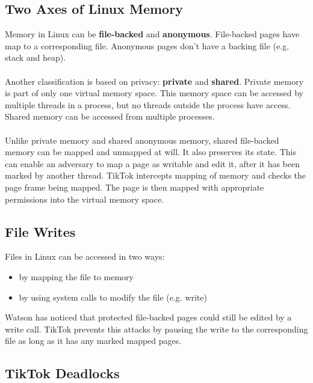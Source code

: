 \documentclass[conference]{IEEEtran}
\begin{document}
\subsection{Two Axes of Linux Memory}

Memory in Linux can be \textbf{file-backed} and \textbf{anonymous}. File-backed pages have map to a corresponding file. 
Anonymous pages don't have a backing file (e.g. stack and heap).
\\
\\
Another classification is based on privacy: \textbf{private} and \textbf{shared}. Private memory is part of only one virtual memory space.
This memory space can be accessed by multiple threads in a process, but no threads outside the process have access.
Shared memory can be accessed from multiple processes.
\\
\\
Unlike private memory and shared anonymous memory, shared file-backed memory can be mapped and unmapped at will. It 
also preserves its state. This can enable an adversary to map a page as writable and edit it, after it has been marked 
by another thread. TikTok intercepts mapping of memory and checks the page frame being mapped. The page is then mapped
with appropriate permissions into the virtual memory space.

\subsection{File Writes}
\label{sec:filewrites}
Files in Linux can be accessed in two ways:
\begin{itemize}
    \item by mapping the file to memory
    \item by using system calls to modify the file (e.g. write)
\end{itemize}

Watson has noticed that protected file-backed pages could still be edited by a write call. TikTok prevents this attacks
by pausing the write to the corresponding file as long as it has any marked mapped pages.

\subsection{TikTok Deadlocks}
\end{document}
